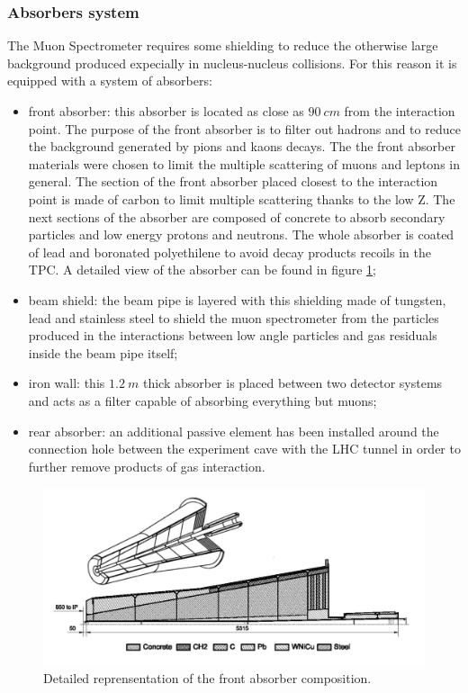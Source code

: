 \subsubsection{Absorbers system}
The Muon Spectrometer requires some shielding to reduce the otherwise large background produced expecially in nucleus-nucleus collisions.
For this reason it is equipped with a system of absorbers:
\begin{itemize}
    \item front absorber: this absorber is located as close as $90\ cm$ from the interaction point. The purpose of the front absorber is to filter out hadrons and to reduce the background generated by pions and kaons decays. The the front absorber materials were chosen to limit the multiple scattering of muons and leptons in general. The section of the front absorber placed closest to the interaction point is made of carbon to limit multiple scattering thanks to the low Z. The next sections of the absorber are composed of concrete to absorb secondary particles and low energy protons and neutrons. The whole absorber is coated of lead and boronated polyethilene to avoid decay products recoils in the TPC. A detailed view of the absorber can be found in figure \ref{fig:absorber};
    \item beam shield: the beam pipe is layered with this shielding made of tungsten, lead and stainless steel to shield the muon spectrometer from the particles produced in the interactions between low angle particles and gas residuals inside the beam pipe itself;
    \item iron wall: this $1.2\ m$ thick absorber is placed between two detector systems and acts as a filter capable of absorbing everything but muons;
    \item rear absorber: an additional passive element has been installed around the connection hole between the experiment cave with the LHC tunnel in order to further remove products of gas interaction.
\end{itemize}

\begin{figure}[!h]
\begin{center}
\includegraphics[width=0.7\linewidth]{Chapters/Introduction/Figs/absorber.pdf}
\caption{Detailed reprensentation of the front absorber composition.}
\label{fig:absorber}
\end{center}
\end{figure}

